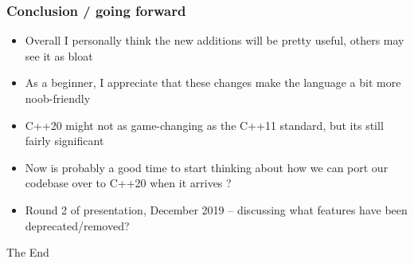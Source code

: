 \documentclass{beamer}
\begin{document}
\begin{frame}
\frametitle{Conclusion / going forward}
\begin{itemize}
\setlength\itemsep{1.5em}
\item Overall I personally think the new additions will be pretty useful, others may see it as bloat
\item As a beginner, I appreciate that these changes make the language a bit more noob-friendly
\item C++20 might not as game-changing as the C++11 standard, but its still fairly significant
\item Now is probably a good time to start thinking about how we can port our codebase over to C++20 when it arrives ?
\item Round 2 of presentation, December 2019 -- discussing what features have been deprecated/removed?
\end{itemize}
\end{frame}

\begin{frame}
\Huge{\centerline{The End}}
\end{frame}
\end{document}

